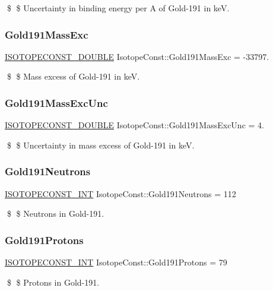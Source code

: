 \$ \$ Uncertainty in binding energy per A of Gold-\/191 in keV. \mbox{\label{group___isotope_const-_gold-_au191_gae6851620c1c92fe55efb7a81714ecb6d}} 
\subsubsection{\texorpdfstring{Gold191\+Mass\+Exc}{Gold191MassExc}}
{\footnotesize\ttfamily \mbox{\hyperlink{group___isotope_const-_macros_ga8f45a7272ce02c0b4c65c44636ed719a}{I\+S\+O\+T\+O\+P\+E\+C\+O\+N\+S\+T\+\_\+\+D\+O\+U\+B\+LE}} Isotope\+Const\+::\+Gold191\+Mass\+Exc = -\/33797.}

\$ \$ Mass excess of Gold-\/191 in keV. \mbox{\label{group___isotope_const-_gold-_au191_ga62dd4ee13c61a3662aafe26e2f003d8a}} 
\subsubsection{\texorpdfstring{Gold191\+Mass\+Exc\+Unc}{Gold191MassExcUnc}}
{\footnotesize\ttfamily \mbox{\hyperlink{group___isotope_const-_macros_ga8f45a7272ce02c0b4c65c44636ed719a}{I\+S\+O\+T\+O\+P\+E\+C\+O\+N\+S\+T\+\_\+\+D\+O\+U\+B\+LE}} Isotope\+Const\+::\+Gold191\+Mass\+Exc\+Unc = 4.}

\$ \$ Uncertainty in mass excess of Gold-\/191 in keV. \mbox{\label{group___isotope_const-_gold-_au191_ga1170adda5d40fb7353353a4b416188fd}} 
\subsubsection{\texorpdfstring{Gold191\+Neutrons}{Gold191Neutrons}}
{\footnotesize\ttfamily \mbox{\hyperlink{group___isotope_const-_macros_ga5f18360b3e99483a35c32d789e62621c}{I\+S\+O\+T\+O\+P\+E\+C\+O\+N\+S\+T\+\_\+\+I\+NT}} Isotope\+Const\+::\+Gold191\+Neutrons = 112}

\$ \$ Neutrons in Gold-\/191. \mbox{\label{group___isotope_const-_gold-_au191_ga54ff93a99f8b8054e8788b0392cc2b49}} 
\subsubsection{\texorpdfstring{Gold191\+Protons}{Gold191Protons}}
{\footnotesize\ttfamily \mbox{\hyperlink{group___isotope_const-_macros_ga5f18360b3e99483a35c32d789e62621c}{I\+S\+O\+T\+O\+P\+E\+C\+O\+N\+S\+T\+\_\+\+I\+NT}} Isotope\+Const\+::\+Gold191\+Protons = 79}

\$ \$ Protons in Gold-\/191. 